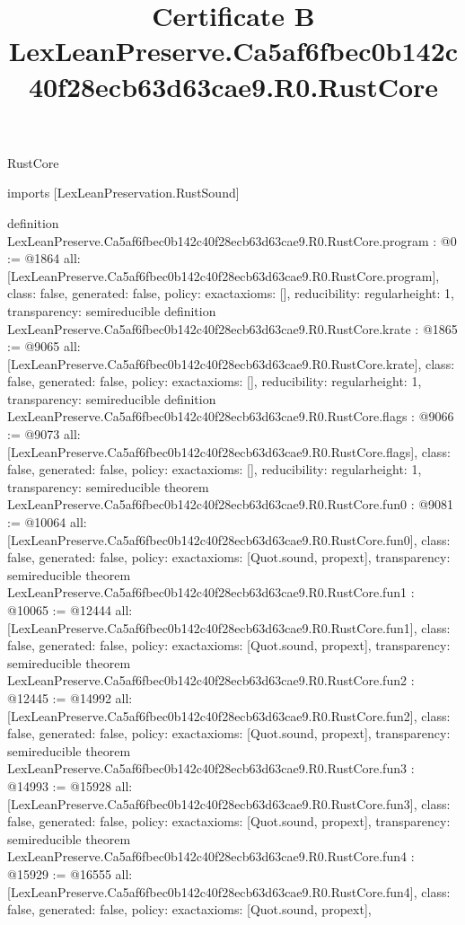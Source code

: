 \begin{lexlean}{RustCore}
\title{Certificate B LexLeanPreserve.Ca5af6fbec0b142c40f28ecb63d63cae9.R0.RustCore}
\begin{coremodule}
imports [LexLeanPreservation.RustSound]

definition LexLeanPreserve.Ca5af6fbec0b142c40f28ecb63d63cae9.R0.RustCore.program : @0 := @1864 {
  all: [LexLeanPreserve.Ca5af6fbec0b142c40f28ecb63d63cae9.R0.RustCore.program],
  class: false,
  generated: false,
  policy: exact{axioms: []},
  reducibility: regular{height: 1},
  transparency: semireducible
}
definition LexLeanPreserve.Ca5af6fbec0b142c40f28ecb63d63cae9.R0.RustCore.krate : @1865 := @9065 {
  all: [LexLeanPreserve.Ca5af6fbec0b142c40f28ecb63d63cae9.R0.RustCore.krate],
  class: false,
  generated: false,
  policy: exact{axioms: []},
  reducibility: regular{height: 1},
  transparency: semireducible
}
definition LexLeanPreserve.Ca5af6fbec0b142c40f28ecb63d63cae9.R0.RustCore.flags : @9066 := @9073 {
  all: [LexLeanPreserve.Ca5af6fbec0b142c40f28ecb63d63cae9.R0.RustCore.flags],
  class: false,
  generated: false,
  policy: exact{axioms: []},
  reducibility: regular{height: 1},
  transparency: semireducible
}
theorem LexLeanPreserve.Ca5af6fbec0b142c40f28ecb63d63cae9.R0.RustCore.fun0 : @9081 := @10064 {
  all: [LexLeanPreserve.Ca5af6fbec0b142c40f28ecb63d63cae9.R0.RustCore.fun0],
  class: false,
  generated: false,
  policy: exact{axioms: [Quot.sound, propext]},
  transparency: semireducible
}
theorem LexLeanPreserve.Ca5af6fbec0b142c40f28ecb63d63cae9.R0.RustCore.fun1 : @10065 := @12444 {
  all: [LexLeanPreserve.Ca5af6fbec0b142c40f28ecb63d63cae9.R0.RustCore.fun1],
  class: false,
  generated: false,
  policy: exact{axioms: [Quot.sound, propext]},
  transparency: semireducible
}
theorem LexLeanPreserve.Ca5af6fbec0b142c40f28ecb63d63cae9.R0.RustCore.fun2 : @12445 := @14992 {
  all: [LexLeanPreserve.Ca5af6fbec0b142c40f28ecb63d63cae9.R0.RustCore.fun2],
  class: false,
  generated: false,
  policy: exact{axioms: [Quot.sound, propext]},
  transparency: semireducible
}
theorem LexLeanPreserve.Ca5af6fbec0b142c40f28ecb63d63cae9.R0.RustCore.fun3 : @14993 := @15928 {
  all: [LexLeanPreserve.Ca5af6fbec0b142c40f28ecb63d63cae9.R0.RustCore.fun3],
  class: false,
  generated: false,
  policy: exact{axioms: [Quot.sound, propext]},
  transparency: semireducible
}
theorem LexLeanPreserve.Ca5af6fbec0b142c40f28ecb63d63cae9.R0.RustCore.fun4 : @15929 := @16555 {
  all: [LexLeanPreserve.Ca5af6fbec0b142c40f28ecb63d63cae9.R0.RustCore.fun4],
  class: false,
  generated: false,
  policy: exact{axioms: [Quot.sound, propext]},
}
\end{coremodule}
\end{lexlean}

